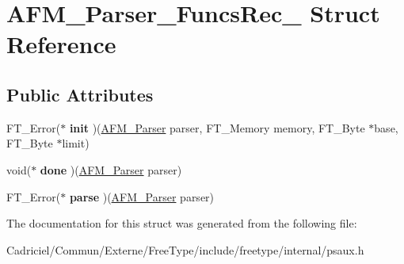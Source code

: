\hypertarget{struct_a_f_m___parser___funcs_rec__}{}\section{A\+F\+M\+\_\+\+Parser\+\_\+\+Funcs\+Rec\+\_\+ Struct Reference}
\label{struct_a_f_m___parser___funcs_rec__}
\subsection*{Public Attributes}
\begin{DoxyCompactItemize}
\item 
F\+T\+\_\+\+Error($\ast$ {\bfseries init} )(\hyperlink{struct_a_f_m___parser_rec__}{A\+F\+M\+\_\+\+Parser} parser, F\+T\+\_\+\+Memory memory, F\+T\+\_\+\+Byte $\ast$base, F\+T\+\_\+\+Byte $\ast$limit)\hypertarget{struct_a_f_m___parser___funcs_rec___ab96ca52171618217bc852d01dbdaf4ad}{}\label{struct_a_f_m___parser___funcs_rec___ab96ca52171618217bc852d01dbdaf4ad}

\item 
void($\ast$ {\bfseries done} )(\hyperlink{struct_a_f_m___parser_rec__}{A\+F\+M\+\_\+\+Parser} parser)\hypertarget{struct_a_f_m___parser___funcs_rec___ae084d9f1b6768f93629073c9d1c98aee}{}\label{struct_a_f_m___parser___funcs_rec___ae084d9f1b6768f93629073c9d1c98aee}

\item 
F\+T\+\_\+\+Error($\ast$ {\bfseries parse} )(\hyperlink{struct_a_f_m___parser_rec__}{A\+F\+M\+\_\+\+Parser} parser)\hypertarget{struct_a_f_m___parser___funcs_rec___ad8f41aafada1b5a84f5e1ac46f545669}{}\label{struct_a_f_m___parser___funcs_rec___ad8f41aafada1b5a84f5e1ac46f545669}

\end{DoxyCompactItemize}


The documentation for this struct was generated from the following file\+:\begin{DoxyCompactItemize}
\item 
Cadriciel/\+Commun/\+Externe/\+Free\+Type/include/freetype/internal/psaux.\+h\end{DoxyCompactItemize}
